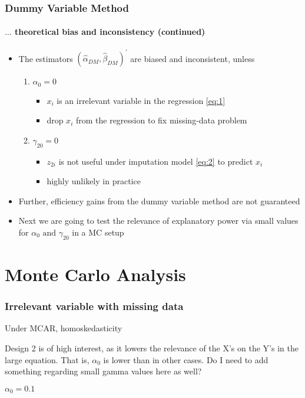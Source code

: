 \documentclass[aspectratio=1610]{beamer}
\begin{document}
\begin{frame}
	\frametitle{Dummy Variable Method}
	\framesubtitle{$\ldots$ theoretical bias and inconsistency (continued)}
	\begin{itemize}
		\item<1-> The estimators $(\hat{\alpha}_{DM}, \hat{\beta}_{DM})^{\prime}$ are biased and inconsistent, unless
		\begin{enumerate}
			\item<2-> $\alpha_0 = 0$
			\begin{itemize}
				\item<2-> $x_i$ is an irrelevant variable in the regression \eqref{eq:1}
				\item<2-> drop $x_i$ from the regression to fix missing-data problem
			\end{itemize}
			\item<3-> $\gamma_{20} = 0$
			\begin{itemize}
				\item<3-> $z_{2i}$ is not useful under imputation model \eqref{eq:2} to predict $x_i$
				\item<3-> highly unlikely in practice
			\end{itemize}
		\end{enumerate}
		\item<4-> Further, efficiency gains from the dummy variable method are not guaranteed
		\item<4-> Next we are going to test the relevance of explanatory power via small values for $\alpha_0 \text{ and } \gamma_{20}$ in a MC setup
	\end{itemize}
\end{frame}

\section{Monte Carlo Analysis}

\begin{frame}
	\frametitle{Irrelevant variable with missing data}
	Under MCAR, homoskedasticity

	Design 2 is of high interest, as it lowers the relevance of the X's on the Y's in the large equation. That is, $\alpha_0$ is lower than in other cases. Do I need to add something regarding small gamma values here as well?

	$\alpha_0 = 0.1$
\end{frame}
\begin{frame}
    
\end{frame}
\end{document}
